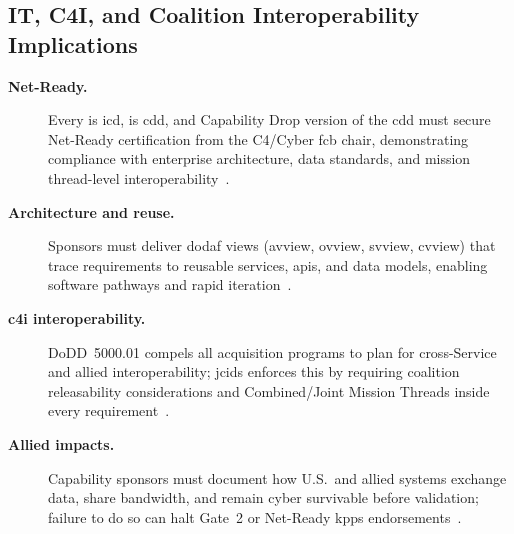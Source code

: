 \documentclass[../main.tex]{subfiles}
\begin{document}
\subsection{IT, C4I, and Coalition Interoperability Implications}
\begin{description}
\item[\textbf{Net-Ready.}] Every \ac{is} \ac{icd}, \ac{is} \ac{cdd}, and Capability Drop version of the \ac{cdd} must secure Net-Ready certification from the C4/Cyber \ac{fcb} chair, demonstrating compliance with enterprise architecture, data standards, and mission thread-level interoperability~\autocite{jcids-manual-2021}.
\item[\textbf{Architecture and reuse.}] Sponsors must deliver \ac{dodaf} views (\ac{avview}, \ac{ovview}, \ac{svview}, \ac{cvview}) that trace requirements to reusable services, \acp{api}, and data models, enabling software pathways and rapid iteration~\autocite{jcids-manual-2021,DoDI5000-02}.
\item[\textbf{\ac{c4i} interoperability.}] DoDD~5000.01 compels all acquisition programs to plan for cross-Service and allied interoperability; \ac{jcids} enforces this by requiring coalition releasability considerations and Combined/Joint Mission Threads inside every requirement~\autocite{DoDD5000-01}.
\item[\textbf{Allied impacts.}] Capability sponsors must document how U.S.\ and allied systems exchange data, share bandwidth, and remain cyber survivable before validation; failure to do so can halt Gate~2 or Net-Ready \acp{kpp} endorsements~\autocite{jcids-manual-2021,edo-3-3-3-jcids-2025}.
\end{description}
\end{document}

